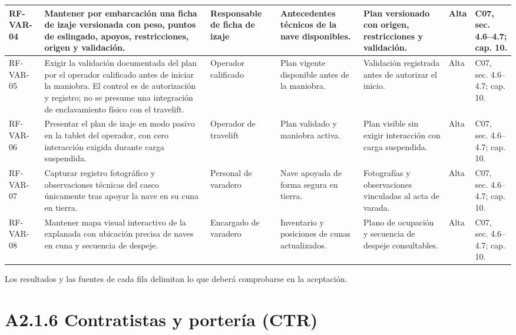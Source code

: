 \begin{longtable}{|L{0.080645\AnchoTablaAnexo}|L{0.262097\AnchoTablaAnexo}|L{0.100806\AnchoTablaAnexo}|L{0.145161\AnchoTablaAnexo}|L{0.173387\AnchoTablaAnexo}|L{0.060484\AnchoTablaAnexo}|L{0.177420\AnchoTablaAnexo}|}
RF-\allowbreak{}VAR-\allowbreak{}04 &
Mantener por embarcación una ficha de izaje versionada con peso, puntos de eslingado, apoyos, restricciones, origen y validación. &
Responsable de ficha de izaje &
Antecedentes técnicos de la nave disponibles. &
Plan versionado con origen, restricciones y validación. &
Alta &
C07, sec. 4.6–4.7; cap. 10. \\ \hline

RF-\allowbreak{}VAR-\allowbreak{}05 &
Exigir la validación documentada del plan por el operador calificado antes de iniciar la maniobra. El control es de autorización y registro; no se presume una integración de enclavamiento físico con el travelift. &
Operador calificado &
Plan vigente disponible antes de la maniobra. &
Validación registrada antes de autorizar el inicio. &
Alta &
C07, sec. 4.6–4.7; cap. 10. \\ \hline

RF-\allowbreak{}VAR-\allowbreak{}06 &
Presentar el plan de izaje en modo pasivo en la tablet del operador, con cero interacción exigida durante carga suspendida. &
Operador de travelift &
Plan validado y maniobra activa. &
Plan visible sin exigir interacción con carga suspendida. &
Alta &
C07, sec. 4.6–4.7; cap. 10. \\ \hline

RF-\allowbreak{}VAR-\allowbreak{}07 &
Capturar registro fotográfico y observaciones técnicas del casco únicamente tras apoyar la nave en su cuna en tierra. &
Personal de varadero &
Nave apoyada de forma segura en tierra. &
Fotografías y observaciones vinculadas al acta de varada. &
Alta &
C07, sec. 4.6–4.7; cap. 10. \\ \hline

RF-\allowbreak{}VAR-\allowbreak{}08 &
Mantener mapa visual interactivo de la explanada con ubicación precisa de naves en cuna y secuencia de despeje. &
Encargado de varadero &
Inventario y posiciones de cunas actualizados. &
Plano de ocupación y secuencia de despeje consultables. &
Alta &
C07, sec. 4.6–4.7; cap. 10. \\ \hline

\end{longtable}

Los resultados y las fuentes de cada fila delimitan lo que deberá comprobarse en la aceptación.

\clearpage\section*{A2.1.6 Contratistas y portería (CTR)}


